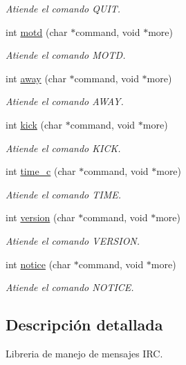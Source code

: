 \begin{DoxyCompactItemize}
\begin{DoxyCompactList}\small\item\em Atiende el comando Q\+U\+I\+T. \end{DoxyCompactList}\item 
int \hyperlink{G-2301-01-P1-irc_8c_aaf2eed4ecab1d18f39a05c4f528783b5}{motd} (char $\ast$command, void $\ast$more)
\begin{DoxyCompactList}\small\item\em Atiende el comando M\+O\+T\+D. \end{DoxyCompactList}\item 
int \hyperlink{G-2301-01-P1-irc_8c_a886e10d26c2d183442290b64b3904c40}{away} (char $\ast$command, void $\ast$more)
\begin{DoxyCompactList}\small\item\em Atiende el comando A\+W\+A\+Y. \end{DoxyCompactList}\item 
int \hyperlink{G-2301-01-P1-irc_8c_a2b61c26ada599f2335e38acdda7f0577}{kick} (char $\ast$command, void $\ast$more)
\begin{DoxyCompactList}\small\item\em Atiende el comando K\+I\+C\+K. \end{DoxyCompactList}\item 
int \hyperlink{G-2301-01-P1-irc_8c_a7e1f50601df112beab6bac8a9b4043a3}{time\+\_\+c} (char $\ast$command, void $\ast$more)
\begin{DoxyCompactList}\small\item\em Atiende el comando T\+I\+M\+E. \end{DoxyCompactList}\item 
int \hyperlink{G-2301-01-P1-irc_8c_a3f0501306323927fed4a21c13e7191d2}{version} (char $\ast$command, void $\ast$more)
\begin{DoxyCompactList}\small\item\em Atiende el comando V\+E\+R\+S\+I\+O\+N. \end{DoxyCompactList}\item 
int \hyperlink{G-2301-01-P1-irc_8c_acda2ab982ae98fa27f49ce891e2fcef0}{notice} (char $\ast$command, void $\ast$more)
\begin{DoxyCompactList}\small\item\em Atiende el comando N\+O\+T\+I\+C\+E. \end{DoxyCompactList}\end{DoxyCompactItemize}


\subsection{Descripción detallada}
Libreria de manejo de mensajes I\+R\+C. 

